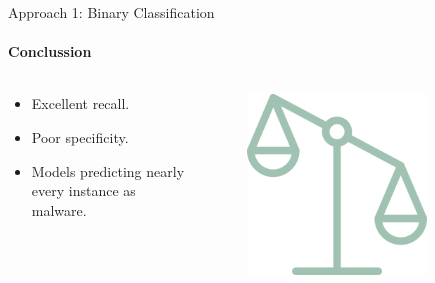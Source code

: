 \documentclass[9pt, pstricks, xcolor=dvipsnames]{beamer}
\begin{document}
\begin{frame}{Approach 1: Binary Classification}
	\framesubtitle{Conclussion}
	\begin{columns}
		\begin{column}{0.5\textwidth}
			\begin{itemize}
				\item Excellent recall.
				\item Poor specificity.
				\item Models predicting nearly every instance as malware.
			\end{itemize}
		\end{column}
		\begin{column}{0.5\textwidth}
			\begin{figure}
				\centering
				\includegraphics[width=0.8\textwidth]{images/scale.png}
			\end{figure}
		\end{column}

	\end{columns}
\end{frame}
\end{document}
